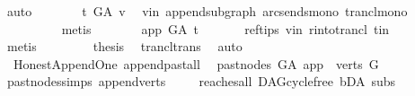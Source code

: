 \begin{isabellebody}
\ auto\isanewline
\ \ \ \ \isamarkupfalse%
\ \isamarkupfalse%
\ {\isachardoublequoteopen}t\ {\isasymrightarrow}\isactrlsup {\isacharplus}{\kern0pt}\isactrlbsub G{\isacharunderscore}{\kern0pt}A\isactrlesub \ v{\isachardoublequoteclose}\ \isamarkupfalse%
\ v{\isacharunderscore}{\kern0pt}in\ append{\isacharunderscore}{\kern0pt}subgraph\ arcs{\isacharunderscore}{\kern0pt}ends{\isacharunderscore}{\kern0pt}mono\ trancl{\isacharunderscore}{\kern0pt}mono\isanewline
\ \ \ \ \ \ \ \ \isamarkupfalse%
\ {\isacharparenleft}{\kern0pt}metis{\isacharparenright}{\kern0pt}\isanewline
\ \ \ \ \isamarkupfalse%
\ \isamarkupfalse%
\ {\isachardoublequoteopen}app\ {\isasymrightarrow}\isactrlsup {\isacharplus}{\kern0pt}\isactrlbsub G{\isacharunderscore}{\kern0pt}A\isactrlesub \ t{\isachardoublequoteclose}\ \isanewline
\ \ \ \ \isamarkupfalse%
\ ref{\isacharunderscore}{\kern0pt}tips\ v{\isacharunderscore}{\kern0pt}in\ r{\isacharunderscore}{\kern0pt}into{\isacharunderscore}{\kern0pt}trancl{\isacharprime}{\kern0pt}\ t{\isacharunderscore}{\kern0pt}in\isanewline
\ \ \ \ \isamarkupfalse%
\ {\isacharparenleft}{\kern0pt}metis{\isacharparenright}{\kern0pt}\ \isanewline
\ \ \ \ \isamarkupfalse%
\ \isamarkupfalse%
\ {\isacharquery}{\kern0pt}thesis\ \isamarkupfalse%
\ trancl{\isacharunderscore}{\kern0pt}trans\ \isamarkupfalse%
\ auto\ \isanewline
\ \ \isamarkupfalse%
\isanewline
{}\isamarkupfalse%
%
\endisatagproof
{\isafoldproof}%
%
\isadelimproof
\isanewline
%
\endisadelimproof
\isanewline
{}\isamarkupfalse%
\ {\isacharparenleft}{\kern0pt}\ Honest{\isacharunderscore}{\kern0pt}Append{\isacharunderscore}{\kern0pt}One{\isacharparenright}{\kern0pt}\ append{\isacharunderscore}{\kern0pt}past{\isacharunderscore}{\kern0pt}all{\isacharcolon}{\kern0pt}\isanewline
\ \ {\isachardoublequoteopen}past{\isacharunderscore}{\kern0pt}nodes\ G{\isacharunderscore}{\kern0pt}A\ app\ {\isacharequal}{\kern0pt}\ verts\ G{\isachardoublequoteclose}\isanewline
%
\isadelimproof
\ \ %
\endisadelimproof
%
\isatagproof
{}\isamarkupfalse%
\ past{\isacharunderscore}{\kern0pt}nodes{\isachardot}{\kern0pt}simps\ append{\isacharunderscore}{\kern0pt}verts\ \isanewline
\ \ \isamarkupfalse%
\ reaches{\isacharunderscore}{\kern0pt}all\ DAG{\isachardot}{\kern0pt}cycle{\isacharunderscore}{\kern0pt}free\ bD{\isacharunderscore}{\kern0pt}A\ subs\isanewline

\end{isabellebody}
